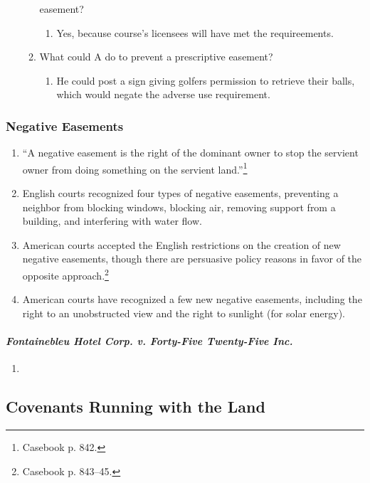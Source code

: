 \begin{enumerate}
\begin{enumerate}
        easement?
        \begin{enumerate}
            \item Yes, because course's licensees will have met the 
            requireements.
        \end{enumerate}
        \item What could A do to prevent a prescriptive easement?
        \begin{enumerate}
            \item He could post a sign giving golfers permission to retrieve 
            their balls, which would negate the adverse use requirement. 
      \end{enumerate}
    \end{enumerate}
\end{enumerate}

\subsubsection{Negative Easements}

\begin{enumerate}
    \item ``A negative easement is the right of the dominant owner to stop the 
    servient owner from doing something on the servient 
    land.''\footnote{Casebook p. 842.}
    \item English courts recognized four types of negative easements, 
    preventing a neighbor from blocking windows, blocking air, removing 
    support from a building, and interfering with water flow.
    \item American courts accepted the English restrictions on the creation of 
    new negative easements, though there are persuasive policy reasons in 
    favor of the opposite approach.\footnote{Casebook p. 843--45.}
    \item American courts have recognized a few new negative easements, 
    including the right to an unobstructed view and the right to sunlight (for 
    solar energy).
\end{enumerate}

\paragraph{\emph{Fontainebleu Hotel Corp. v. Forty-Five Twenty-Five Inc.}}

\begin{enumerate}
    \item %
\end{enumerate}


\subsection{Covenants Running with the Land}

